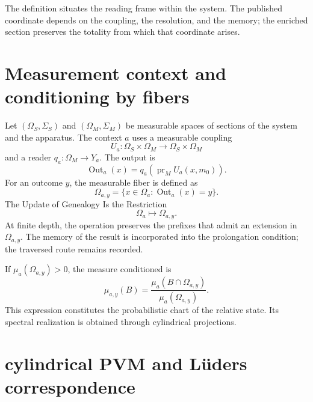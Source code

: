 The definition situates the reading frame within the
system. The published coordinate depends on the coupling, the
resolution, and the memory; the enriched
section preserves the totality from which that coordinate
arises.

\section{Measurement context and conditioning by fibers}

Let \((\Omega_S,\Sigma_S)\) and \((\Omega_M,\Sigma_M)\) be measurable spaces
of sections of the system and the apparatus. The context \(a\) uses a
measurable coupling
\begin{equation}
 U_a:\Omega_S\times\Omega_M
 \longrightarrow\Omega_S\times\Omega_M
 \label{eq:rm-obs-measurable-coupling}
\end{equation}
and a reader \(q_a:\Omega_M\to Y_a\). The output is
\begin{equation}
 \operatorname{Out}_a(x)
 =q_a\!\left(\operatorname{pr}_M U_a(x,m_0)\right).
 \label{eq:rm-obs-output}
\end{equation}
For an outcome \(y\), the measurable fiber is defined as
\begin{equation}
 \Omega_{a,y}
 =\{x\in\Omega_a:\operatorname{Out}_a(x)=y\}.
 \label{eq:rm-obs-outcome-fiber}
\end{equation}
The Update of Genealogy Is the Restriction
\begin{equation}
 \Omega_a\longmapsto\Omega_{a,y}.
 \label{eq:rm-obs-genealogical-update}
\end{equation}
At finite depth, the operation preserves the prefixes that admit an
extension in \(\Omega_{a,y}\). The memory of the result is incorporated into the
prolongation condition; the traversed route remains recorded.

If \(\mu_a(\Omega_{a,y})>0\), the measure conditioned is
\begin{equation}
 \mu_{a,y}(B)
 =\frac{\mu_a(B\cap\Omega_{a,y})}
 {\mu_a(\Omega_{a,y})}.
 \label{eq:rm-obs-conditional-measure}
\end{equation}
This expression constitutes the probabilistic chart of the relative state.
Its spectral realization is obtained through cylindrical projections.

\section{cylindrical PVM and Lüders correspondence}

